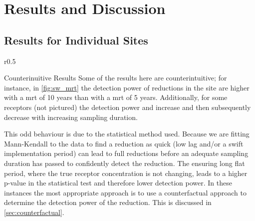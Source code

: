 
\section[Results and Discussion]{Results and Discussion} \label{sec:results}

\subsection[Site results]{Results for Individual Sites} \label{sec:site_results}


\begin{wrapfigure}{r}{0.5\textwidth}
    \begin{breakawaybox}[
        label={box:wierdresults}]{Counterinuitive Results}
        Some of the results here are counterintuitive; for instance, in \autoref{fig:sw_mrt} the detection power of reductions in the site are higher with a \gls{mrt} of 10 years than with a \gls{mrt} of 5 years. Additionally, for some receptors (not pictured) the detection power and increase and then subsequently decrease with increasing sampling duration.

        This odd behaviour is due to the statistical method used. Because we are fitting Mann-Kendall to the data to find a reduction as quick (low lag and/or a swift implementation period) can lead to full reductions before an adequate sampling duration has passed to confidently detect the reduction.  The ensuring long flat period, where the true receptor concentration is not changing, leads to a higher p-value in the statistical test and therefore lower detection power.  In these instances the most appropriate approach is to use a counterfactual approach to determine the detection power of the reduction.  This is discussed in \autoref{sec:counterfactual}.
    \end{breakawaybox}
\end{wrapfigure}

